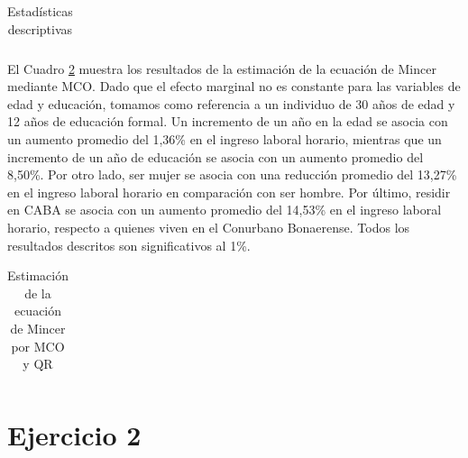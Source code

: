 \documentclass[11pt]{article}
\begin{document}
\begin{table}[H]
    \centering
    \caption[Estadísticas descriptivas]{Estadísticas descriptivas}
    \label{tab:sum_stats}
    \begin{adjustbox}{max width=\textwidth}
        \begin{tabular}{l*{2}{c}}
            
        \end{tabular}
    \end{adjustbox}
\end{table}

El Cuadro \ref{tab:OLS_mincer} muestra los resultados de la estimación de la ecuación de Mincer mediante MCO. Dado que el efecto marginal no es constante para las variables de edad y educación, tomamos como referencia a un individuo de 30 años de edad y 12 años de educación formal. Un incremento de un año en la edad se asocia con un aumento promedio del 1,36\% en el ingreso laboral horario, mientras que un incremento de un año de educación se asocia con un aumento promedio del 8,50\%. Por otro lado, ser mujer se asocia con una reducción promedio del 13,27\% en el ingreso laboral horario en comparación con ser hombre. Por último, residir en CABA se asocia con un aumento promedio del 14,53\% en el ingreso laboral horario, respecto a quienes viven en el Conurbano Bonaerense. Todos los resultados descritos son significativos al 1\%.
\begin{table}[H]
    \centering
    \caption[Estimación de la ecuación de Mincer por MCO y QR]{Estimación de la ecuación de Mincer por MCO y QR}
    \label{tab:OLS_mincer}
    \begin{adjustbox}{max width=0.8\textwidth}
        \begin{tabular}{l*{2}{c}}
            
        \end{tabular}
    \end{adjustbox}
\end{table}


\section*{Ejercicio 2}
\end{document}

